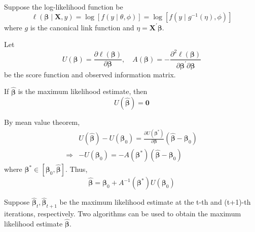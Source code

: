 Suppose the log-likelihood function be
\begin{equation}
	\ell\left(\boldsymbol{\beta}\mid\mathbf{X},y\right)=\log\left[f\left(y\mid\theta,\phi\right)\right]=\log\left[f\left(y\mid g^{-1}(\eta),\phi\right)\right]
\end{equation}
where $g$ is the canonical link function and $\eta=\mathbf{X}^{\prime}\boldsymbol{\beta}$.

Let
\begin{equation*}
	U\left(\boldsymbol{\beta}\right)=\frac{\partial\ell\left(\boldsymbol{\beta}\right)}{\partial\boldsymbol{\beta}},\quad A\left(\boldsymbol{\beta}\right)=-\frac{\partial^{2}\ell\left(\boldsymbol{\beta}\right)}{\partial\boldsymbol{\beta}^{\prime}\partial\boldsymbol{\beta}}
\end{equation*}
be the score function and observed information matrix.

If $\hat{\boldsymbol{\beta}}$ is the maximum likelihood estimate, then
\begin{equation*}
	U\left(\hat{\boldsymbol{\beta}}\right)=\mathbf{0}
\end{equation*}

By mean value theorem,
\begin{equation*}
	\begin{aligned}
		            & U\left(\hat{\boldsymbol{\beta}}\right)-U\left(\boldsymbol{\beta}_{0}\right)=\frac{\partial U\left(\boldsymbol{\beta}^{*}\right)}{\partial\boldsymbol{\beta}}\left(\hat{\boldsymbol{\beta}}-\boldsymbol{\beta}_{0}\right) \\
		\Rightarrow & -U\left(\boldsymbol{\beta}_{0}\right)=-A\left(\boldsymbol{\beta}^{*}\right)\left(\hat{\boldsymbol{\beta}}-\boldsymbol{\beta}_{0}\right)
	\end{aligned}
\end{equation*}
where $\boldsymbol{\beta}^{*}\in\left[\boldsymbol{\beta}_{0},\hat{\boldsymbol{\beta}}\right]$. Thus,
\begin{equation*}
	\hat{\boldsymbol{\beta}}=\boldsymbol{\beta}_{0}+A^{-1}\left(\boldsymbol{\beta}^{*}\right)U\left(\boldsymbol{\beta}_{0}\right)
\end{equation*}

Suppose $\hat{\boldsymbol{\beta}}_{t},\hat{\boldsymbol{\beta}}_{t+1}$ be the maximum likelihood estimate at the t-th and (t+1)-th iterations, respectively. Two algorithms can be used to obtain the maximum likelihood estimate $\hat{\boldsymbol{\beta}}$.

